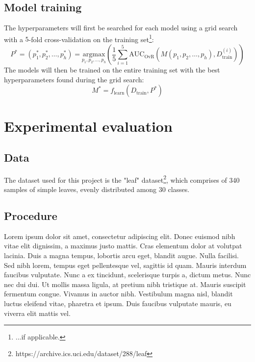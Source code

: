 \documentclass{article}
\begin{document}
\subsection{Model training}
The hyperparameters will first be searched for each model using a grid search with a $5$-fold cross-validation on the training set\footnote{...if applicable.}:
\begin{equation*}
    P^{*} = 
    (p_{1}^{*}, p_{2}^{*}, \dots, p_{h}^{*}) = 
    \underset{p_{1}, p_{2}, \dots, p_{h}}{\text{argmax}}
        \left(\frac{1}{5}\sum_{i=1}^{5}\text{AUC}_{\text{OvR}}
            (M(p_{1}, p_{2}, \dots, p_{h}), 
            D_{\text{train}}^{(i)})
        \right)
\end{equation*}
The models will then be trained on the entire training set with the best hyperparameters found during the grid search:
\begin{equation*}
    M^{*} = f_{\text{learn}}{(D_{\text{train}}, P^{*})}
\end{equation*}



\section{Experimental evaluation}



\subsection{Data}
The dataset used for this project is the "leaf" dataset\footnote{https://archive.ics.uci.edu/dataset/288/leaf}, which comprises of 340 samples of simple leaves, evenly distributed among 30 classes.



\subsection{Procedure}
Lorem ipsum dolor sit amet, consectetur adipiscing elit.
Donec euismod nibh vitae elit dignissim, a maximus justo mattis.
Cras elementum dolor at volutpat lacinia.
Duis a magna tempus, lobortis arcu eget, blandit augue.
Nulla facilisi.
Sed nibh lorem, tempus eget pellentesque vel, sagittis id quam.
Mauris interdum faucibus vulputate.
Nunc a ex tincidunt, scelerisque turpis a, dictum metus.
Nunc nec dui dui.
Ut mollis massa ligula, at pretium nibh tristique at.
Mauris suscipit fermentum congue.
Vivamus in auctor nibh.
Vestibulum magna nisl, blandit luctus eleifend vitae, pharetra et ipsum.
Duis faucibus vulputate mauris, eu viverra elit mattis vel.
\end{document}
